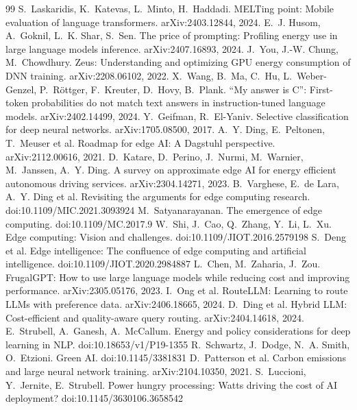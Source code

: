 \begin{thebibliography}{99}
 S.~Laskaridis, K.~Katevas, L.~Minto, H.~Haddadi. MELTing point: Mobile evaluation of language transformers. arXiv:2403.12844, 2024.
 E.~J. Husom, A.~Goknil, L.~K. Shar, S.~Sen. The price of prompting: Profiling energy use in large language models inference. arXiv:2407.16893, 2024.
 J.~You, J.-W. Chung, M.~Chowdhury. Zeus: Understanding and optimizing GPU energy consumption of DNN training. arXiv:2208.06102, 2022.
 X.~Wang, B.~Ma, C.~Hu, L.~Weber-Genzel, P.~R\"ottger, F.~Kreuter, D.~Hovy, B.~Plank. ``My answer is C'': First-token probabilities do not match text answers in instruction-tuned language models. arXiv:2402.14499, 2024.
 Y.~Geifman, R.~El-Yaniv. Selective classification for deep neural networks. arXiv:1705.08500, 2017.
 A.~Y. Ding, E.~Peltonen, T.~Meuser et al. Roadmap for edge AI: A Dagstuhl perspective. arXiv:2112.00616, 2021.
 D.~Katare, D.~Perino, J.~Nurmi, M.~Warnier, M.~Janssen, A.~Y. Ding. A survey on approximate edge AI for energy efficient autonomous driving services. arXiv:2304.14271, 2023.
 B.~Varghese, E.~de Lara, A.~Y. Ding et al. Revisiting the arguments for edge computing research. doi:10.1109/MIC.2021.3093924
 M.~Satyanarayanan. The emergence of edge computing. doi:10.1109/MC.2017.9
 W.~Shi, J.~Cao, Q.~Zhang, Y.~Li, L.~Xu. Edge computing: Vision and challenges. doi:10.1109/JIOT.2016.2579198
 S.~Deng et al. Edge intelligence: The confluence of edge computing and artificial intelligence. doi:10.1109/JIOT.2020.2984887
 L.~Chen, M.~Zaharia, J.~Zou. FrugalGPT: How to use large language models while reducing cost and improving performance. arXiv:2305.05176, 2023.
 I.~Ong et al. RouteLLM: Learning to route LLMs with preference data. arXiv:2406.18665, 2024.
 D.~Ding et al. Hybrid LLM: Cost-efficient and quality-aware query routing. arXiv:2404.14618, 2024.
 E.~Strubell, A.~Ganesh, A.~McCallum. Energy and policy considerations for deep learning in NLP. doi:10.18653/v1/P19-1355
 R.~Schwartz, J.~Dodge, N.~A. Smith, O.~Etzioni. Green AI. doi:10.1145/3381831
 D.~Patterson et al. Carbon emissions and large neural network training. arXiv:2104.10350, 2021.
 S.~Luccioni, Y.~Jernite, E.~Strubell. Power hungry processing: Watts driving the cost of AI deployment? doi:10.1145/3630106.3658542

\end{thebibliography}
